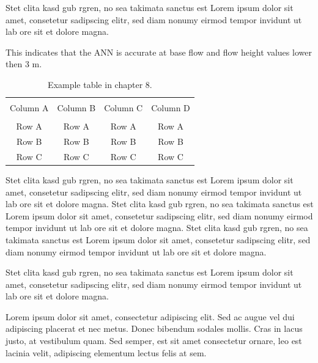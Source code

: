 Stet clita kasd gub rgren, no sea takimata sanctus est Lorem ipsum dolor sit amet, consetetur sadipscing elitr, sed diam nonumy eirmod tempor invidunt ut lab ore sit et dolore magna.

This indicates that the ANN is accurate at base flow and flow height values lower then 3 m. 

\begin{table}[!htbp]
	{\setlength{\tabcolsep}{14pt}
		\caption{Example table in chapter 8.}
		\begin{center}
			\vspace{-6mm}
			\begin{tabular}{cccc}
				\hline \\[-2.45ex] \hline \\[-2.1ex]
				Column A & Column B & Column C & Column D \\
				\hline \\[-1.8ex]
				Row A & Row A & Row A & Row A \\
				Row B & Row B & Row B & Row B \\
				Row C & Row C & Row C & Row C \\
				[-0ex] \hline
			\end{tabular}
			\vspace{-6mm}
		\end{center}
		\label{Table8.1}}
\end{table}

Stet clita kasd gub rgren, no sea takimata sanctus est Lorem ipsum dolor sit amet, consetetur sadipscing elitr, sed diam nonumy eirmod tempor invidunt ut lab ore sit et dolore magna. Stet clita kasd gub rgren, no sea takimata sanctus est Lorem ipsum dolor sit amet, consetetur sadipscing elitr, sed diam nonumy eirmod tempor invidunt ut lab ore sit et dolore magna. Stet clita kasd gub rgren, no sea takimata sanctus est Lorem ipsum dolor sit amet, consetetur sadipscing elitr, sed diam nonumy eirmod tempor invidunt ut lab ore sit et dolore magna. 

Stet clita kasd gub rgren, no sea takimata sanctus est Lorem ipsum dolor sit amet, consetetur sadipscing elitr, sed diam nonumy eirmod tempor invidunt ut lab ore sit et dolore magna. 


Lorem ipsum dolor sit amet, consectetur adipiscing elit. Sed ac augue vel dui adipiscing placerat et nec metus. Donec bibendum sodales mollis. Cras in lacus justo, at vestibulum quam. Sed semper, est sit amet consectetur ornare, leo est lacinia velit, adipiscing elementum lectus felis at sem.

